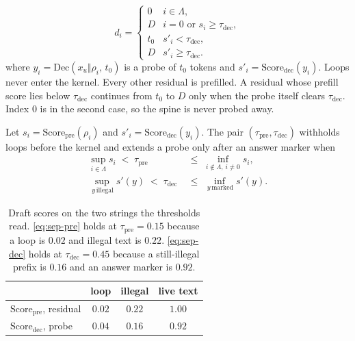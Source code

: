 \begin{equation}
\label{eq:dec}
d_i=
\begin{cases}
0 & i\in\Lambda,\\
D & i{=}0 \text{ or } s_i\ge\tau_{\mathrm{dec}},\\
t_0 & s'_i<\tau_{\mathrm{dec}},\\
D & s'_i\ge\tau_{\mathrm{dec}}.
\end{cases}
\end{equation}
where $y_i=\mathrm{Dec}(x_u\Vert\rho_i,\,t_0)$ is a probe of $t_0$ tokens and $s'_i=\mathrm{Score}_{\mathrm{dec}}(y_i)$.
Loops never enter the kernel.
Every other residual is prefilled.
A residual whose prefill score lies below $\tau_{\mathrm{dec}}$ continues from $t_0$ to $D$ only when the probe itself clears $\tau_{\mathrm{dec}}$.
Index $0$ is in the second case, so the spine is never probed away.

\begin{proposition}
\label{prop:sep}
Let $s_i=\mathrm{Score}_{\mathrm{pre}}(\rho_i)$ and $s'_i=\mathrm{Score}_{\mathrm{dec}}(y_i)$.
The pair $(\tau_{\mathrm{pre}},\tau_{\mathrm{dec}})$ withholds loops before the kernel and extends a probe only after an answer marker when
\begin{align}
\sup_{i\in\Lambda} s_i \;<\; \tau_{\mathrm{pre}} \;&\le\; \inf_{i\notin\Lambda,\,i\neq 0} s_i, \label{eq:sep-pre}\\
\sup_{\,y\,\mathrm{illegal}} s'(y) \;<\; \tau_{\mathrm{dec}} \;&\le\; \inf_{\,y\,\mathrm{marked}} s'(y). \label{eq:sep-dec}
\end{align}
\end{proposition}

\begin{table}[t]
\centering
\caption{Draft scores on the two strings the thresholds read.
\eqref{eq:sep-pre} holds at $\tau_{\mathrm{pre}}{=}0.15$ because a loop is $0.02$ and illegal text is $0.22$.
\eqref{eq:sep-dec} holds at $\tau_{\mathrm{dec}}{=}0.45$ because a still-illegal prefix is $0.16$ and an answer marker is $0.92$.}
\label{tab:scores}
\scriptsize
\setlength{\tabcolsep}{4pt}
\begin{tabular}{@{}lccc@{}}
\toprule
 & loop & illegal & live text \\
\midrule
$\mathrm{Score}_{\mathrm{pre}}$, residual & $0.02$ & $0.22$ & $1.00$ \\
$\mathrm{Score}_{\mathrm{dec}}$, probe & $0.04$ & $0.16$ & $0.92$ \\
\bottomrule
\end{tabular}
\end{table}

